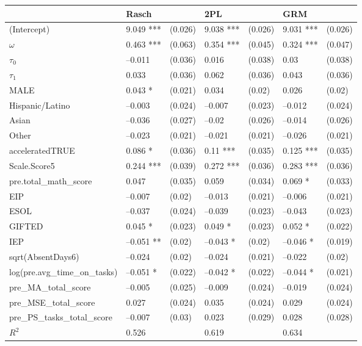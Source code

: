\begin{tabular}{lllllll}
  \hline
  & Rasch &  & 2PL &  & GRM &  \\ 
   \hline
(Intercept) & 9.049 *** & (0.026) & 9.038 *** & (0.026) & 9.031 *** & (0.026) \\ 
  $\omega$ & 0.463 *** & (0.063) & 0.354 *** & (0.045) & 0.324 *** & (0.047) \\ 
  $\tau_0$ & --0.011 & (0.036) & 0.016 & (0.038) & 0.03 & (0.038) \\ 
  $\tau_1$ & 0.033 & (0.036) & 0.062 & (0.036) & 0.043 & (0.036) \\ 
  MALE & 0.043 * & (0.021) & 0.034 & (0.02) & 0.026 & (0.02) \\ 
  Hispanic/Latino & --0.003 & (0.024) & --0.007 & (0.023) & --0.012 & (0.024) \\ 
  Asian & --0.036 & (0.027) & --0.02 & (0.026) & --0.014 & (0.026) \\ 
  Other & --0.023 & (0.021) & --0.021 & (0.021) & --0.026 & (0.021) \\ 
  acceleratedTRUE & 0.086 * & (0.036) & 0.11 *** & (0.035) & 0.125 *** & (0.035) \\ 
  Scale.Score5 & 0.244 *** & (0.039) & 0.272 *** & (0.036) & 0.283 *** & (0.036) \\ 
  pre.total_math_score & 0.047 & (0.035) & 0.059 & (0.034) & 0.069 * & (0.033) \\ 
  EIP & --0.007 & (0.02) & --0.013 & (0.021) & --0.006 & (0.021) \\ 
  ESOL & --0.037 & (0.024) & --0.039 & (0.023) & --0.043 & (0.023) \\ 
  GIFTED & 0.045 * & (0.023) & 0.049 * & (0.023) & 0.052 * & (0.022) \\ 
  IEP & --0.051 ** & (0.02) & --0.043 * & (0.02) & --0.046 * & (0.019) \\ 
  sqrt(AbsentDays6) & --0.024 & (0.02) & --0.024 & (0.021) & --0.022 & (0.02) \\ 
  log(pre.avg_time_on_tasks) & --0.051 * & (0.022) & --0.042 * & (0.022) & --0.044 * & (0.021) \\ 
  pre_MA_total_score & --0.005 & (0.025) & --0.009 & (0.024) & --0.019 & (0.024) \\ 
  pre_MSE_total_score & 0.027 & (0.024) & 0.035 & (0.024) & 0.029 & (0.024) \\ 
  pre_PS_tasks_total_score & --0.007 & (0.03) & 0.023 & (0.029) & 0.028 & (0.028) \\ 
   \hline
$R^2$ & 0.526 &  & 0.619 &  & 0.634 &  \\ 
   \hline
\end{tabular}
